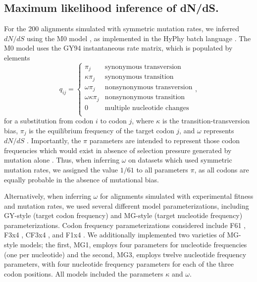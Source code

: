 \documentclass[11pt]{article}
\begin{document}
\subsection*{Maximum likelihood inference of dN/dS.}
For the 200 alignments simulated with symmetric mutation rates, we inferred $dN/dS$ using the M0 model \cite{Yangetal2000}, as implemented in the HyPhy batch language \cite{KosakovskyPondetal2005}. The M0 model uses the GY94 instantaneous rate matrix, which is populated by elements
\begin{equation}\label{eq:GY94}
q_{ij} = \left\{ 
	\begin{array}{rl}
	\pi_j                  &\mbox{synonymous transversion} \\
	\kappa \pi_j           &\mbox{synonymous transition} \\
 	\omega \pi_j           &\mbox{nonsynonymous transversion} \\
 	\omega \kappa \pi_j    &\mbox{nonsynonymous transition} \\
	0                      &\mbox{multiple nucleotide changes} \\             
	\end{array} \right.,
\end{equation} for a substitution from codon $i$ to codon $j$, where $\kappa$ is the transition-transversion bias, $\pi_j$ is the equilibrium frequency of the target codon $j$, and $\omega$ represents $dN/dS$ \cite{GoldmanYang1994,NielsenYang1998}. Importantly, the $\pi$ parameters are intended to represent those codon frequencies which would exist in absence of selection pressure generated by mutation alone \cite{GoldmanYang1994,MuseGaut1994,YN00,Yang2006}. Thus, when inferring $\omega$ on datasets which used symmetric mutation rates, we assigned the value $1/61$ to all parameters $\pi$, as all codons are  equally probable in the absence of mutational bias.

Alternatively, when inferring $\omega$ for alignments simulated with experimental fitness and mutation rates, we used several different model parameterizations, including GY-style \cite{GoldmanYang1994} (target codon frequency) and MG-style \cite{MuseGaut1994} (target nucleotide frequency) parameterizations. Codon frequency parameterizations considered include F61 \cite{GoldmanYang1994}, F3x4 \cite{GoldmanYang1994}, CF3x4 \cite{KosakovskyPond2010}, and F1x4 \cite{MuseGaut1994}. We additionally implemented two varieties of MG-style models; the first, MG1, employs four parameters for nucleotide frequencies (one per nucleotide) and the second, MG3, employs twelve nucleotide frequency parameters, with four nucleotide frequency parameters for each of the three codon positions. All models included the parameters $\kappa$ and $\omega$. 
\end{document}
